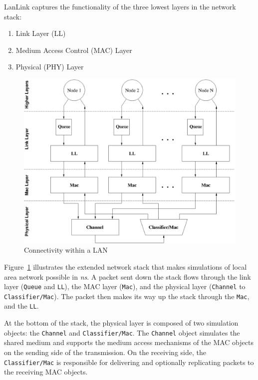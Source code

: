 LanLink captures the functionality of the three lowest layers in the
network stack:

\begin{enumerate}
\item
	Link Layer (LL)
\item
	Medium Access Control (MAC) Layer
\item
	Physical (PHY) Layer
\end{enumerate}

\begin{figure}[tb]
  \centerline{\includegraphics{lan1}}
  \caption{Connectivity within a LAN}
  \label{fig:lan-connectivity}
\end{figure}


Figure~\ref{fig:lan-connectivity} illustrates the extended network
stack that makes simulations of local area network possible in \emph{ns}.  A
packet sent down the stack flows
through the link layer ({\tt Queue} and {\tt LL}), the MAC layer
({\tt Mac}), and the physical layer ({\tt Channel} to
{\tt Classifier/Mac}).  The packet then makes its way up the stack through
the {\tt Mac}, and the {\tt LL}.

At the bottom of the stack, the physical layer is composed of two
simulation objects: the {\tt Channel} and {\tt Classifier/Mac}.  The
{\tt Channel} object simulates the shared medium and supports the medium
access mechanisms of the MAC objects on the sending side of the
transmission.  On the receiving side, the {\tt Classifier/Mac} is
responsible for delivering and optionally replicating packets to the
receiving MAC objects.

